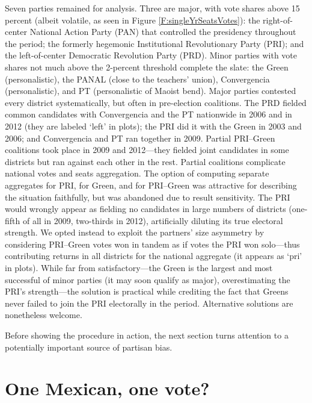 \documentclass[letter,12pt]{article}
\begin{document}
Seven parties remained for analysis. Three are major, with vote shares above 15 percent (albeit volatile, as seen in Figure \ref{F:singleYrSeatsVotes}): the right-of-center National Action Party (PAN) that controlled the presidency throughout the period; the formerly hegemonic Institutional Revolutionary Party (PRI); and the left-of-center Democratic Revolution Party (PRD). Minor parties with vote shares not much above the 2-percent threshold complete the slate: the Green (personalistic), the PANAL (close to the teachers' union), Convergencia (personalistic), and PT (personalistic of Maoist bend). Major parties contested every district systematically, but often in pre-election coalitions. The PRD fielded common candidates with Convergencia and the PT nationwide in 2006 and in 2012 (they are labeled `left' in plots); the PRI did it with the Green in 2003 and 2006; and Convergencia and PT ran together in 2009. Partial PRI--Green coalitions took place in 2009 and 2012---they fielded joint candidates in some districts but ran against each other in the rest. Partial coalitions complicate national votes and seats aggregation. The option of computing separate aggregates for PRI, for Green, and for PRI--Green was attractive for describing the situation faithfully, but was abandoned due to result sensitivity. The PRI would wrongly appear as fielding no candidates in large numbers of districts (one-fifth of all in 2009, two-thirds in 2012), artificially diluting its true electoral strength. We opted instead to exploit the partners' size asymmetry by considering PRI--Green votes won in tandem as if votes the PRI won solo---thus contributing returns in all districts for the national aggregate (it appears as `pri' in plots). While far from satisfactory---the Green is the largest and most successful of minor parties (it may soon qualify as major), overestimating the PRI's strength---the solution is practical while crediting the fact that Greens never failed to join the PRI electorally in the period. Alternative solutions are nonetheless welcome. 

Before showing the procedure in action, the next section turns attention to a potentially important source of partisan bias. 





\section{One Mexican, one vote?}

\end{document}
